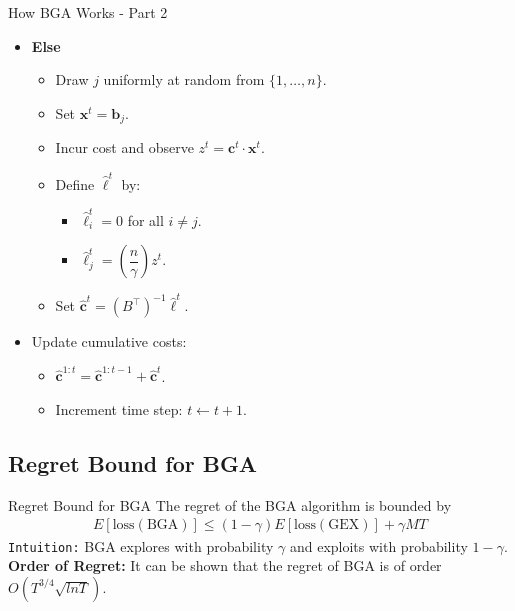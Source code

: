 \documentclass{beamer}
\begin{document}
\begin{frame}{How BGA Works - Part 2}
    \begin{itemize}
        \item \textbf{Else}
        \begin{itemize}
            \item Draw $j$ uniformly at random from $\{1, \ldots, n\}$.
            \item Set $\mathbf{x}^t = \mathbf{b}_j$.
            \item Incur cost and observe $z^t = \mathbf{c}^t \cdot \mathbf{x}^t$.
            \item Define $\hat{\ell}^t$ by:
            \begin{itemize}
                \item $\hat{\ell}^t_i = 0$ for all $i \neq j$.
                \item $\hat{\ell}^t_j = \left(\dfrac{n}{\gamma}\right) z^t$.
            \end{itemize}
            \item Set $\hat{\mathbf{c}}^t = (B^\top)^{-1} \hat{\ell}^t$.
        \end{itemize}
        \pause

        \item Update cumulative costs:
        \begin{itemize}
            \item $\hat{\mathbf{c}}^{1:t} = \hat{\mathbf{c}}^{1:t-1} + \hat{\mathbf{c}}^t$.
            \item Increment time step: $t \gets t + 1$.
        \end{itemize}
    \end{itemize}
\end{frame}

\subsection{Regret Bound for BGA}
\begin{frame}{Regret Bound for BGA}
    The regret of the BGA algorithm is bounded by
    \begin{align*}
        E[\text{loss}(\text{BGA})] \leq (1 - \gamma) E[\text{loss}(\text{GEX})] + \gamma MT
    \end{align*}
    \texttt{Intuition:} BGA explores with probability $\gamma$ and exploits with probability $1 - \gamma$. \\
    \textbf{Order of Regret:} It can be shown that the regret of BGA is of order $O(T^{3/4}\sqrt{ln T})$.
\end{frame}
\end{document}
